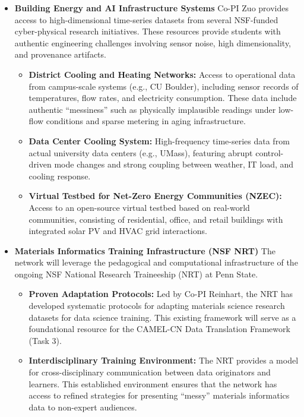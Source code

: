 \documentclass[11pt]{article}
\begin{document}
\begin{itemize}
\item \textbf{Building Energy and AI Infrastructure Systems}
Co-PI Zuo provides access to high-dimensional time-series datasets from several NSF-funded cyber-physical research initiatives. These resources provide students with authentic engineering challenges involving sensor noise, high dimensionality, and provenance artifacts.
    \begin{itemize}[noitemsep]
        \item \textbf{District Cooling and Heating Networks:} Access to operational data from campus-scale systems (e.g., CU Boulder), including sensor records of temperatures, flow rates, and electricity consumption. These data include authentic ``messiness'' such as physically implausible readings under low-flow conditions and sparse metering in aging infrastructure.
        \item \textbf{Data Center Cooling System:} High-frequency time-series data from actual university data centers (e.g., UMass), featuring abrupt control-driven mode changes and strong coupling between weather, IT load, and cooling response.
        \item \textbf{Virtual Testbed for Net-Zero Energy Communities (NZEC):} Access to an open-source virtual testbed based on real-world communities, consisting of residential, office, and retail buildings with integrated solar PV and HVAC grid interactions.
    \end{itemize}

\item \textbf{Materials Informatics Training Infrastructure (NSF NRT)}
The network will leverage the pedagogical and computational infrastructure of the ongoing NSF National Research Traineeship (NRT) at Penn State. 
    \begin{itemize}[noitemsep]
        \item \textbf{Proven Adaptation Protocols:} Led by Co-PI Reinhart, the NRT has developed systematic protocols for adapting materials science research datasets for data science training. This existing framework will serve as a foundational resource for the CAMEL-CN Data Translation Framework (Task 3).
        \item \textbf{Interdisciplinary Training Environment:} The NRT provides a model for cross-disciplinary communication between data originators and learners. This established environment ensures that the network has access to refined strategies for presenting ``messy'' materials informatics data to non-expert audiences.
    \end{itemize}


\end{itemize}
\end{document}
